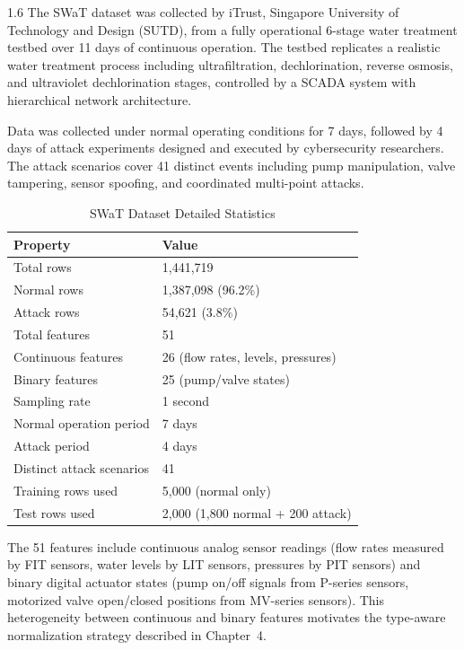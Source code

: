 \begin{spacing}{1.6}
The SWaT dataset \cite{swat} was collected by iTrust, Singapore University of
Technology and Design (SUTD), from a fully operational 6-stage water treatment
testbed over 11 days of continuous operation. The testbed replicates a realistic
water treatment process including ultrafiltration, dechlorination, reverse
osmosis, and ultraviolet dechlorination stages, controlled by a SCADA system
with hierarchical network architecture.

Data was collected under normal operating conditions for 7 days, followed by
4 days of attack experiments designed and executed by cybersecurity researchers.
The attack scenarios cover 41 distinct events including pump manipulation, valve
tampering, sensor spoofing, and coordinated multi-point attacks.

\begin{table}[H]
\centering
\caption{SWaT Dataset Detailed Statistics}
\label{tab:swat_detail}
\begin{tabular}{ll}
\toprule
\textbf{Property} & \textbf{Value} \\
\midrule
Total rows & 1,441,719 \\
Normal rows & 1,387,098 (96.2\%) \\
Attack rows & 54,621 (3.8\%) \\
Total features & 51 \\
Continuous features & 26 (flow rates, levels, pressures) \\
Binary features & 25 (pump/valve states) \\
Sampling rate & 1 second \\
Normal operation period & 7 days \\
Attack period & 4 days \\
Distinct attack scenarios & 41 \\
Training rows used & 5,000 (normal only) \\
Test rows used & 2,000 (1,800 normal + 200 attack) \\
\bottomrule
\end{tabular}
\end{table}

The 51 features include continuous analog sensor readings (flow rates measured
by FIT sensors, water levels by LIT sensors, pressures by PIT sensors) and
binary digital actuator states (pump on/off signals from P-series sensors,
motorized valve open/closed positions from MV-series sensors). This
heterogeneity between continuous and binary features motivates the type-aware
normalization strategy described in Chapter~4.


\end{spacing}
